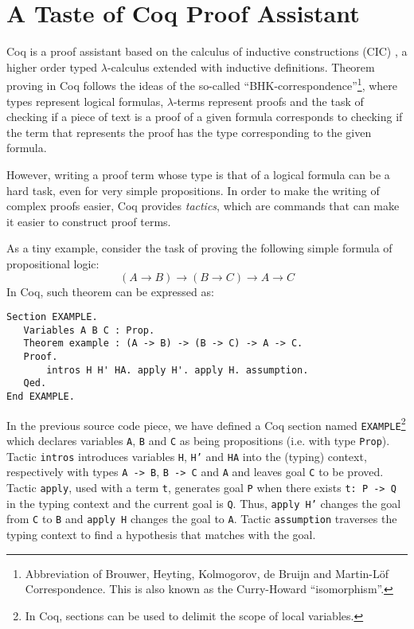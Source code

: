 \section{A Taste of Coq Proof Assistant}\label{coq}

Coq is a proof assistant based on the calculus of inductive
constructions (CIC) , a higher order typed
$\lambda$-calculus extended with inductive definitions.  Theorem
proving in Coq follows the ideas of the so-called
``BHK-cor\-res\-pon\-dence''\footnote{Abbreviation of Brouwer, Heyting,
  Kolmogorov, de Bruijn and Martin-L\"of Correspondence. This is also
  known as the Curry-Howard ``isomorphism''.}, where types represent
logical formulas, $\lambda$-terms represent proofs
 and the task of checking if a piece of text is a
proof of a given formula corresponds to checking if the term that
represents the proof has the type corresponding to the given formula.

However, writing a proof term whose type is that of a logical formula
can be a hard task, even for very simple propositions.  In order to
make the writing of complex proofs easier, Coq provides
\emph{tactics}, which are commands that can make it easier to
construct proof terms.

As a tiny example, consider the task of proving the following simple
formula of propositional logic:
\[
(A \to B)\to (B\to C) \to A \to C
\]
In Coq, such theorem can be expressed as:
\begin{lstlisting}
Section EXAMPLE.
   Variables A B C : Prop.
   Theorem example : (A -> B) -> (B -> C) -> A -> C.
   Proof.
       intros H H' HA. apply H'. apply H. assumption.
   Qed.
End EXAMPLE.
\end{lstlisting}
In the previous source code piece, we have defined a Coq section named
\texttt{EXAMPLE}\footnote{In Coq, sections can be used to delimit the
  scope of local variables.} which declares variables \texttt{A},
\texttt{B} and \texttt{C} as being propositions (i.e. with type
\texttt{Prop}). Tactic \texttt{intros} introduces variables
\texttt{H}, \texttt{H'} and \texttt{HA} into the (typing) context,
respectively with types \texttt{A -> B}, \texttt{B -> C} and
\texttt{A} and leaves goal \texttt{C} to be proved. Tactic
\texttt{apply}, used with a term \texttt{t}, generates goal \texttt{P}
when there exists \texttt{t: P -> Q} in the typing context and the
current goal is \texttt{Q}. Thus, \texttt{apply H'} changes the goal
from \texttt{C} to \texttt{B} and \texttt{apply H} changes the goal to
\texttt{A}. Tactic \texttt{assumption} traverses the typing context to
find a hypothesis that matches with the goal.

